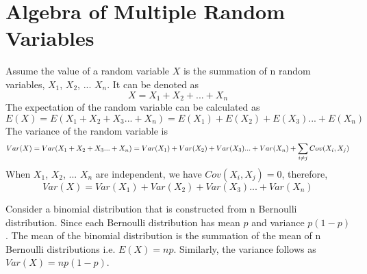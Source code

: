 \documentclass[12pt, oneside]{article}
\begin{document}
\section{Algebra of Multiple Random Variables}
Assume the value of a random variable $X$ is the summation of n random variables, $X_1$, $X_2$, ... $X_n$. It can be denoted as
$$X=X_1+X_2+ ... +X_n$$
The expectation of the random variable can be calculated as 
$$E(X)=E(X_1+X_2+X_3 ... +X_n)=E(X_1)+E(X_2)+E(X_3)...+E(X_n)$$
The variance of the random variable is 
$$Var(X)=Var(X_1+X_2+X_3 ... +X_n)=Var(X_1)+Var(X_2)+Var(X_3)...+Var(X_n)+\sum_{i\neq	j}\mathnormal{Cov}(X_i, X_j)$$
When $X_1$, $X_2$, ... $X_n$ are independent, we have $Cov(X_i, X_j)=0$, therefore,
$$Var(X)=Var(X_1)+Var(X_2)+Var(X_3)...+Var(X_n)$$

Consider a binomial distribution that is constructed from n Bernoulli distribution. Since each Bernoulli distribution has mean $p$ and variance $p(1-p)$. The mean of the binomial distribution is the summation of the mean of n Bernoulli distributions i.e. $E(X)=np$. Similarly, the variance follows as $Var(X)=np(1-p)$.
\end{document}
